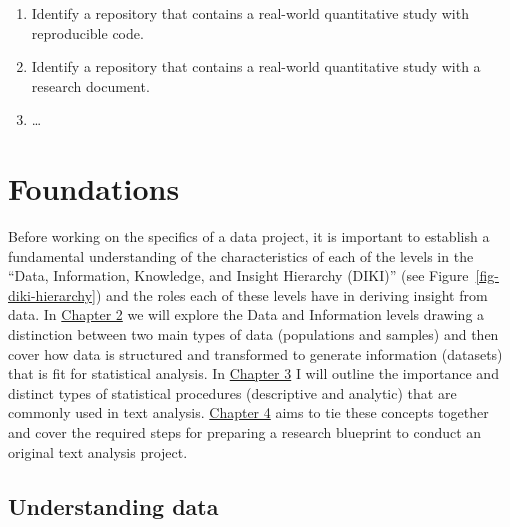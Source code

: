 \documentclass[
  letterpaper,
]{scrbook}
\providecommand{\tightlist}{%
  \setlength{\itemsep}{0pt}\setlength{\parskip}{0pt}}\usepackage{longtable,booktabs,array}
\begin{document}
\begin{tcolorbox}[enhanced jigsaw, title=\textcolor{quarto-callout-note-color}{\faInfo}\hspace{0.5em}{Technical exercises}, titlerule=0mm, toptitle=1mm, colbacktitle=quarto-callout-note-color!10!white, bottomtitle=1mm, left=2mm, colframe=quarto-callout-note-color-frame, breakable, toprule=.15mm, colback=white, opacitybacktitle=0.6, leftrule=.75mm, rightrule=.15mm, bottomrule=.15mm, arc=.35mm, coltitle=black, opacityback=0]

\begin{enumerate}
\def\labelenumi{\arabic{enumi}.}
\tightlist
\item
  Identify a repository that contains a real-world quantitative study
  with reproducible code.
\item
  Identify a repository that contains a real-world quantitative study
  with a research document.
\item
  \ldots{}
\end{enumerate}

\end{tcolorbox}

\part{Foundations}

Before working on the specifics of a data project, it is important to
establish a fundamental understanding of the characteristics of each of
the levels in the ``Data, Information, Knowledge, and Insight Hierarchy
(DIKI)'' (see Figure~\ref{fig-diki-hierarchy}) and the roles each of
these levels have in deriving insight from data. In
\protect\hyperlink{understanding-data-chapter}{Chapter 2} we will
explore the Data and Information levels drawing a distinction between
two main types of data (populations and samples) and then cover how data
is structured and transformed to generate information (datasets) that is
fit for statistical analysis. In
\protect\hyperlink{approaching-analysis-chapter}{Chapter 3} I will
outline the importance and distinct types of statistical procedures
(descriptive and analytic) that are commonly used in text analysis.
\protect\hyperlink{framing-research-chapter}{Chapter 4} aims to tie
these concepts together and cover the required steps for preparing a
research blueprint to conduct an original text analysis project.

\hypertarget{sec-understanding-data}{%
\chapter{Understanding data}\label{sec-understanding-data}}
\end{document}
